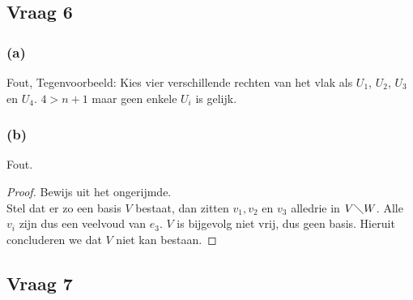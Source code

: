 \documentclass[lineaire_algebra_oplossingen.tex]{subfiles}
\begin{document}
\subsection{Vraag 6}
\subsubsection*{(a)}
Fout, Tegenvoorbeeld:
Kies vier verschillende rechten van het vlak als $U_1$, $U_2$, $U_3$ en $U_4$. $4 > n+1$ maar geen enkele $U_i$ is gelijk.

\subsubsection*{(b)}
Fout.
\begin{proof}
Bewijs uit het ongerijmde.\\
Stel dat er zo een basis $V$ bestaat, dan zitten $v_1,v_2$ en $v_3$ alledrie in $V\diagdown W$. Alle $v_i$ zijn dus een veelvoud van $e_3$. $V$ is bijgevolg niet vrij, dus geen basis. Hieruit concluderen we dat $V$ niet kan bestaan.
\end{proof}

\subsection{Vraag 7}
\end{document}
